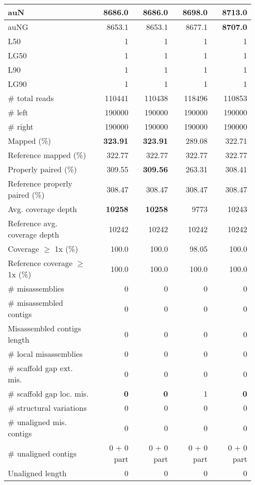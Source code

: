 \documentclass[12pt,a4paper]{article}
\begin{document}
\begin{table}[ht]
\begin{center}
\begin{tabular}{|l*{4}{|r}|}
auN & 8686.0 & 8686.0 & 8698.0 & {\bf 8713.0} \\ \hline
auNG & 8653.1 & 8653.1 & 8677.1 & {\bf 8707.0} \\ \hline
L50 & 1 & 1 & 1 & 1 \\ \hline
LG50 & 1 & 1 & 1 & 1 \\ \hline
L90 & 1 & 1 & 1 & 1 \\ \hline
LG90 & 1 & 1 & 1 & 1 \\ \hline
\# total reads & 110441 & 110438 & 118496 & 110853 \\ \hline
\# left & 190000 & 190000 & 190000 & 190000 \\ \hline
\# right & 190000 & 190000 & 190000 & 190000 \\ \hline
Mapped (\%) & {\bf 323.91} & {\bf 323.91} & 289.08 & 322.71 \\ \hline
Reference mapped (\%) & 322.77 & 322.77 & 322.77 & 322.77 \\ \hline
Properly paired (\%) & 309.55 & {\bf 309.56} & 263.31 & 308.41 \\ \hline
Reference properly paired (\%) & 308.47 & 308.47 & 308.47 & 308.47 \\ \hline
Avg. coverage depth & {\bf 10258} & {\bf 10258} & 9773 & 10243 \\ \hline
Reference avg. coverage depth & 10242 & 10242 & 10242 & 10242 \\ \hline
Coverage $\geq$ 1x (\%) & 100.0 & 100.0 & 98.05 & 100.0 \\ \hline
Reference coverage $\geq$ 1x (\%) & 100.0 & 100.0 & 100.0 & 100.0 \\ \hline
\# misassemblies & 0 & 0 & 0 & 0 \\ \hline
\# misassembled contigs & 0 & 0 & 0 & 0 \\ \hline
Misassembled contigs length & 0 & 0 & 0 & 0 \\ \hline
\# local misassemblies & 0 & 0 & 0 & 0 \\ \hline
\# scaffold gap ext. mis. & 0 & 0 & 0 & 0 \\ \hline
\# scaffold gap loc. mis. & {\bf 0} & {\bf 0} & 1 & {\bf 0} \\ \hline
\# structural variations & 0 & 0 & 0 & 0 \\ \hline
\# unaligned mis. contigs & 0 & 0 & 0 & 0 \\ \hline
\# unaligned contigs & 0 + 0 part & 0 + 0 part & 0 + 0 part & 0 + 0 part \\ \hline
Unaligned length & 0 & 0 & 0 & 0 \\ \hline

\end{tabular}
\end{center}
\end{table}
\end{document}
